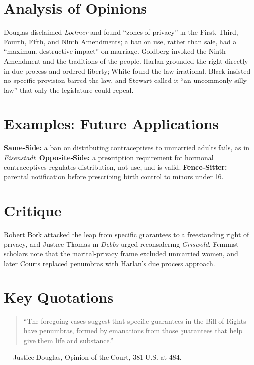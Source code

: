 \documentclass[12pt]{article}
\begin{document}
\section{Analysis of Opinions}
Douglas disclaimed \textit{Lochner} and found ``zones of privacy'' in the First, Third, Fourth, Fifth, and Ninth Amendments; a ban on use, rather than sale, had a ``maximum destructive impact'' on marriage. Goldberg invoked the Ninth Amendment and the traditions of the people. Harlan grounded the right directly in due process and ordered liberty; White found the law irrational. Black insisted no specific provision barred the law, and Stewart called it ``an uncommonly silly law'' that only the legislature could repeal.

\section{Examples: Future Applications}
\textbf{Same-Side:} a ban on distributing contraceptives to unmarried adults fails, as in \textit{Eisenstadt}. \textbf{Opposite-Side:} a prescription requirement for hormonal contraceptives regulates distribution, not use, and is valid. \textbf{Fence-Sitter:} parental notification before prescribing birth control to minors under 16.

\section{Critique}
Robert Bork attacked the leap from specific guarantees to a freestanding right of privacy, and Justice Thomas in \textit{Dobbs} urged reconsidering \textit{Griswold}. Feminist scholars note that the marital-privacy frame excluded unmarried women, and later Courts replaced penumbras with Harlan's due process approach.

\section{Key Quotations}
\begin{quote}
``The foregoing cases suggest that specific guarantees in the Bill of Rights have penumbras, formed by emanations from those guarantees that help give them life and substance.''
\end{quote}
\noindent --- Justice Douglas, Opinion of the Court, 381 U.S. at 484.
\end{document}

